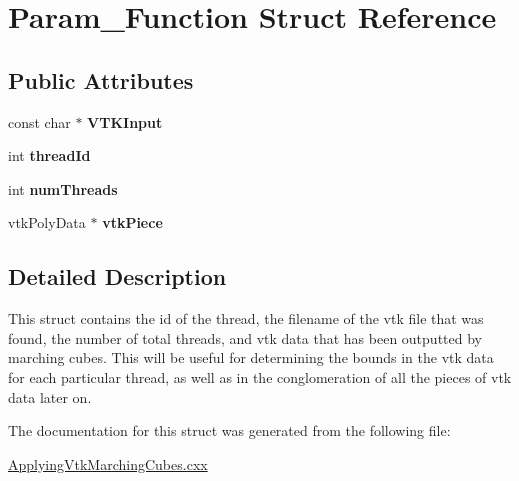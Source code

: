 \hypertarget{structParam__Function}{\section{\-Param\-\_\-\-Function \-Struct \-Reference}
\label{structParam__Function}
}
\subsection*{\-Public \-Attributes}
\begin{DoxyCompactItemize}
\item 
\hypertarget{structParam__Function_a4c6f53c4c47811f4718d953ac1992baa}{const char $\ast$ {\bfseries \-V\-T\-K\-Input}}\label{structParam__Function_a4c6f53c4c47811f4718d953ac1992baa}

\item 
\hypertarget{structParam__Function_a22891fef7632bbca3be29572c6f4f44b}{int {\bfseries thread\-Id}}\label{structParam__Function_a22891fef7632bbca3be29572c6f4f44b}

\item 
\hypertarget{structParam__Function_adf10a3e99d8c479168f44822e31b9c7a}{int {\bfseries num\-Threads}}\label{structParam__Function_adf10a3e99d8c479168f44822e31b9c7a}

\item 
\hypertarget{structParam__Function_a83337a785b859dc4998582842e9719e5}{vtk\-Poly\-Data $\ast$ {\bfseries vtk\-Piece}}\label{structParam__Function_a83337a785b859dc4998582842e9719e5}

\end{DoxyCompactItemize}


\subsection{\-Detailed \-Description}
\-This struct contains the id of the thread, the filename of the vtk file that was found, the number of total threads, and vtk data that has been outputted by marching cubes. \-This will be useful for determining the bounds in the vtk data for each particular thread, as well as in the conglomeration of all the pieces of vtk data later on. 

\-The documentation for this struct was generated from the following file\-:\begin{DoxyCompactItemize}
\item 
\hyperlink{ApplyingVtkMarchingCubes_8cxx}{\-Applying\-Vtk\-Marching\-Cubes.\-cxx}\end{DoxyCompactItemize}
